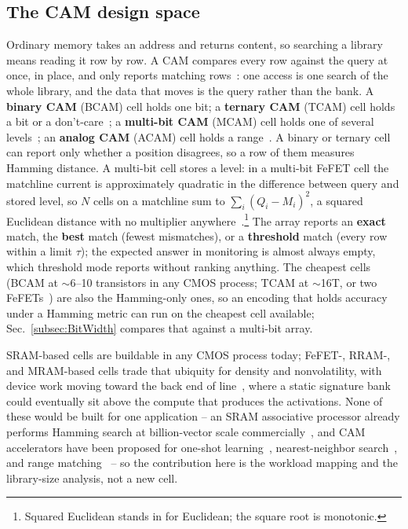 \documentclass[conference]{IEEEtran}
\newcommand{\cam}{{CAM}\xspace}
\newcommand{\tcam}{{TCAM}\xspace}
\newcommand{\mcam}{{MCAM}\xspace}
\newcommand{\acam}{{ACAM}\xspace}
\newcommand{\fefet}{{FeFET}\xspace}
\newcommand{\fefets}{{FeFETs}\xspace}
\begin{document}
\subsection{The CAM design space}
\label{subsec:CAMspace}
\label{subsec:CAMtech}
Ordinary memory takes an address and returns content, so searching a
library means reading it row by row. A \cam compares every row
against the query at once, in place, and only reports matching
rows~\cite{pagiamtzis2006cam}: one access is one search of the whole
library, and the data that moves is the query rather than the bank.
A \textbf{binary \cam} (BCAM) cell holds one bit; a \textbf{ternary
\cam} (\tcam) cell holds a bit or a don't-care~\cite{ni2019fetcam}; a
\textbf{multi-bit \cam} (\mcam) cell holds one of several
levels~\cite{kazemi2021fefetcam}; an \textbf{analog \cam} (\acam)
cell holds a range~\cite{li2020acam}. A binary or ternary cell can
report only whether a position disagrees, so a row of them measures
Hamming distance. A multi-bit cell stores a level: in a multi-bit
\fefet cell the matchline current is approximately quadratic in the
difference between query and stored level, so $N$ cells on a
matchline sum to $\sum_i (Q_i-M_i)^2$, a squared Euclidean distance
with no multiplier
anywhere~\cite{kazemi2021fefetcam,kazemi2022hdcfefet}.\footnote{Squared
Euclidean stands in for Euclidean; the square root is monotonic.} The
array reports an \textbf{exact}
match, the \textbf{best} match (fewest mismatches), or a
\textbf{threshold} match (every row within a limit $\tau$); the
expected answer in monitoring is almost always empty, which threshold
mode reports without ranking anything. The cheapest cells (BCAM at
$\sim$6--10 transistors in any CMOS process; \tcam at $\sim$16T, or
two \fefets~\cite{pagiamtzis2006cam,ni2019fetcam}) are also the
Hamming-only ones, so an encoding that holds accuracy under a Hamming
metric can run on the cheapest cell available;
Sec.~\ref{subsec:BitWidth} compares that against a multi-bit array.

SRAM-based cells are buildable in any CMOS process today; \fefet-,
RRAM-, and MRAM-based cells trade that ubiquity for density and
nonvolatility, with device work moving toward the back end of
line~\cite{dutta2020m3dfefet}, where a static signature bank could
eventually sit above the compute that produces the activations. None
of these would be built for one application -- an SRAM associative
processor already performs Hamming search at billion-vector scale
commercially~\cite{gsi2025apu}, and \cam accelerators have been
proposed for one-shot learning~\cite{ni2019fetcam}, nearest-neighbor
search~\cite{kazemi2021fefetcam}, and range
matching~\cite{li2020acam} -- so the contribution here is the
workload mapping and the library-size analysis, not a new cell.
\end{document}
